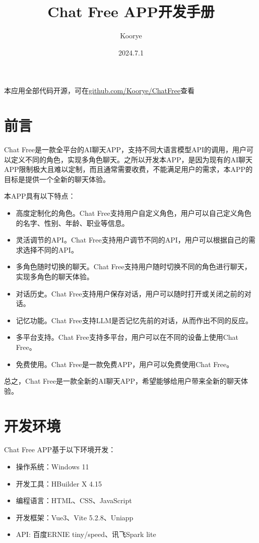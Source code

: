 \documentclass{article}
\title{Chat Free APP开发手册}
\author{Koorye}
\date{2024.7.1}
\begin{document}
\maketitle
\begin{center}
本应用全部代码开源，可在\href{https://github.com/Koorye/ChatFree}{github.com/Koorye/ChatFree}查看
\end{center}

\section{前言}

Chat Free是一款全平台的AI聊天APP，支持不同大语言模型API的调用，用户可以定义不同的角色，实现多角色聊天。之所以开发本APP，是因为现有的AI聊天APP限制极大且难以定制，而且通常需要收费，不能满足用户的需求，本APP的目标是提供一个全新的聊天体验。

本APP具有以下特点：

\begin{itemize}
    \item 高度定制化的角色。Chat Free支持用户自定义角色，用户可以自己定义角色的名字、性别、年龄、职业等信息。
    \item 灵活调节的API。Chat Free支持用户调节不同的API，用户可以根据自己的需求选择不同的API。
    \item 多角色随时切换的聊天。Chat Free支持用户随时切换不同的角色进行聊天，实现多角色的聊天体验。
    \item 对话历史。Chat Free支持用户保存对话，用户可以随时打开或关闭之前的对话。
    \item 记忆功能。Chat Free支持LLM是否记忆先前的对话，从而作出不同的反应。
    \item 多平台支持。Chat Free支持多平台，用户可以在不同的设备上使用Chat Free。
    \item 免费使用。Chat Free是一款免费APP，用户可以免费使用Chat Free。
\end{itemize}

总之，Chat Free是一款全新的AI聊天APP，希望能够给用户带来全新的聊天体验。

\section{开发环境}

Chat Free APP基于以下环境开发：

\begin{itemize}
    \item 操作系统：Windows 11
    \item 开发工具：HBuilder X 4.15
    \item 编程语言：HTML、CSS、JavaScript
    \item 开发框架：Vue3、Vite 5.2.8、Uniapp
    \item API: 百度ERNIE tiny/speed、讯飞Spark lite
\end{itemize}
\end{document}
